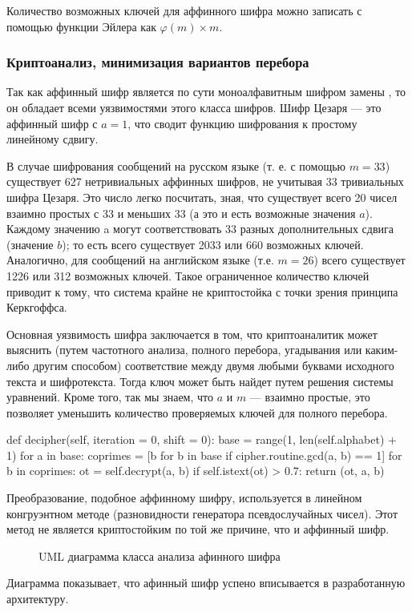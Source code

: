 Количество возможных ключей для аффинного шифра можно записать 
с помощью функции Эйлера как $\varphi(m) \times m$.

\subsubsection{Криптоанализ, минимизация вариантов перебора}

Так как аффинный шифр является по сути моноалфавитным шифром замены
, то он обладает всеми уязвимостями этого класса шифров. Шифр Цезаря —
это аффинный шифр с $a = 1$, что сводит функцию шифрования к простому 
линейному сдвигу.

В случае шифрования сообщений на русском языке (т. е. с помощью $m = 33$) 
существует 627 нетривиальных аффинных шифров, не учитывая 33 тривиальных шифра 
Цезаря. Это число легко посчитать, зная, что существует всего 20 чисел 
взаимно простых с 33 и меньших 33 (а это и есть возможные значения 
$a$). Каждому значению a могут соответствовать 33 разных дополнительных 
сдвига (значение $b$); то есть всего существует 2033 или 660 возможных 
ключей. Аналогично, для сообщений на английском языке (т.е. $m = 26$) 
всего существует 1226 или 312 возможных ключей. Такое ограниченное 
количество ключей приводит к тому, что система крайне не криптостойка 
с точки зрения принципа Керкгоффса.

Основная уязвимость шифра заключается в том, что криптоаналитик может 
выяснить (путем частотного анализа, полного перебора, угадывания или 
каким-либо другим способом) соответствие между двумя любыми буквами 
исходного текста и шифротекста. Тогда ключ может быть найдет путем 
решения системы уравнений. Кроме того, так мы знаем, что $a$ и $m$ — взаимно 
простые, это позволяет уменьшить количество проверяемых ключей для 
полного перебора.

\begin{listing}[1]{1}
def decipher(self, iteration = 0, shift = 0):
    base = range(1, len(self.alphabet) + 1)
    for a in base:
        coprimes = [b for b in base if cipher.routine.gcd(a, b) == 1]
        for b in coprimes:
            ot = self.decrypt(a, b)
            if self.istext(ot) > 0.7:
                return (ot, a, b)
\end{listing}

Преобразование, подобное аффинному шифру, используется в линейном 
конгруэнтном методе (разновидности генератора псевдослучайных чисел).
Этот метод не является криптостойким по той же причине, что и аффинный 
шифр.

\begin{figure}[bh]
\noindent{}
\caption{UML диаграмма класса анализа афинного шифра}
\label{figCurves}
\end{figure}

Диаграмма показывает, что афинный шифр успено вписывается 
в разработанную архитектуру.

